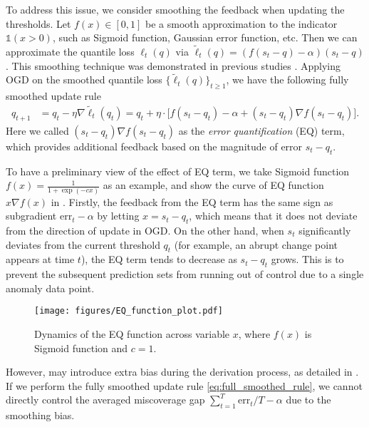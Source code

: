 To address this issue, we consider smoothing the feedback when updating the thresholds. Let $f(x) \in [0,1]$ be a smooth approximation to the indicator $\mathds{1}(x>0)$, such as Sigmoid function, Gaussian error function, etc. Then we can approximate the quantile loss $\ell_t(q)$ via $\tilde{\ell}_t(q) = (f(s_t - q)-\alpha)(s_t-q)$. This smoothing technique was demonstrated in previous studies \citep{kaplan2017smoothed,fernandes2021smoothing}.
Applying OGD on the smoothed quantile loss $\{\tilde{\ell}_t(q)\}_{t\geq 1}$, we have the following fully smoothed update rule
\begin{equation}
    \label{eq:full_smoothed_rule}
\begin{aligned}
q_{t+1} &= q_t - \eta \nabla \tilde{\ell}_t(q_t)= q_t + \eta\cdot \big[f(s_t-q_t)-\alpha+(s_t-q_t) \nabla f(s_t-q_t)\big].
\end{aligned}
\end{equation}
Here we called $(s_t-q_t) \nabla f(s_t-q_t)$ as the \emph{error quantification} (EQ) term, which provides additional feedback based on the magnitude of error $s_t-q_t$.

To have a preliminary view of the effect of EQ term, we take Sigmoid function $f(x)=\frac{1}{1+\exp{(-cx)}}$ as an example, and show the curve of EQ function $x \nabla f(x)$ in . Firstly, the feedback from the EQ term has the same sign as subgradient $\mathrm{err}_t - \alpha$ by letting $x = s_t-q_t$, which means that it does not deviate from the direction of update in OGD. 
On the other hand, when $s_t$ significantly deviates from the current threshold $q_t$ (for example, an abrupt change point appears at time $t$), the EQ term tends to decrease as $s_t - q_t$ grows. This is to prevent the subsequent prediction sets from running out of control due to a single anomaly data point.

\begin{figure*}[h]
  \centering
  \texttt{[image: figures/EQ\_function\_plot.pdf]}
  \vspace{-0.6em}
  \caption{Dynamics of the EQ function across variable $x$, where $f(x)$ is Sigmoid function and $c=1$.}
  \label{EQ_function_plot}
  \vspace{-0.5em}
\end{figure*}
\vspace{-0.5em}
However,  may introduce extra bias during the derivation process, as detailed in .
If we perform the fully smoothed update rule \eqref{eq:full_smoothed_rule}, we cannot directly control the averaged miscoverage gap $\sum_{t=1}^T\mathrm{err}_t/T -\alpha$ due to the smoothing bias.

